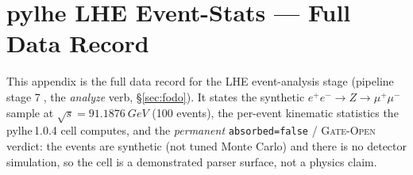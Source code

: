 \section{pylhe LHE Event-Stats --- Full Data Record}
\label{app:lhe}

This appendix is the full data record for the LHE event-analysis stage
(pipeline stage \textcircled{\scriptsize 7}, the \emph{analyze} verb,
\S\ref{sec:fodo}). It states the synthetic
$e^+e^-\!\to Z\!\to\mu^+\mu^-$ sample at $\sqrt{s}=\SI{91.1876}{GeV}$
(100 events), the per-event kinematic statistics the pylhe\,1.0.4 cell
computes, and the \emph{permanent} \texttt{absorbed=false} /
\textsc{Gate-Open} verdict: the events are synthetic (not tuned Monte
Carlo) and there is no detector simulation, so the cell is a
demonstrated parser surface, not a physics claim.

